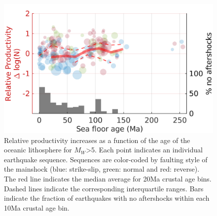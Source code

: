 \documentclass[draft]{agujournal}
\begin{document}
\begin{figure}
\centering
\includegraphics{figures/prod_vs_age_mw5.png}
\caption{Relative productivity increases as a function of the age of the oceanic lithosphere for $M_W$>5. Each point indicates an individual earthquake sequence. Sequences are color-coded by faulting style of the mainshock (blue: strike-slip, green: normal and red: reverse). The red line indicates the median average for 20Ma crustal age bins. Dashed lines indicate the corresponding interquartile ranges. Bars indicate the fraction of earthquakes with no aftershocks within each 10Ma crustal age bin.}
\label{fig:prod_vs_age}
\end{figure}   
\end{document}
